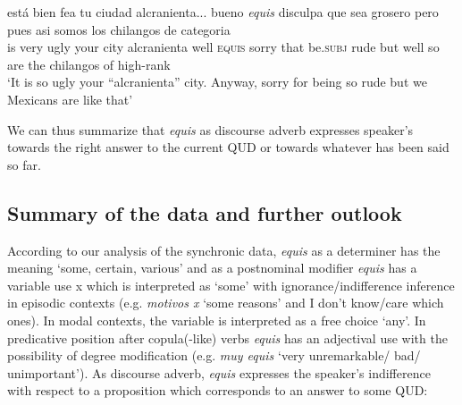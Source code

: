 \documentclass[output=paper
,modfonts
,nonflat]{langsci/langscibook}
\begin{document}
\ea
\gll está bien fea tu ciudad alcranienta... bueno \textit{equis} disculpa que sea grosero pero pues asi somos los chilangos de categoria\\
is very ugly your city alcranienta well \textsc{equis} sorry that be.\textsc{subj} rude but well so are the chilangos of high-rank\\
\glt ‘It is so ugly your “alcranienta” city. Anyway, sorry for being so rude but we Mexicans are like that’
\z

We can thus summarize that \textit{equis} as discourse adverb expresses speaker’s towards the right answer to the current QUD or towards whatever has been said so far.

\subsection{Summary of the data and further outlook}\label{sec:kellert:2.5}
According to our analysis of the synchronic data, \textit{equis} as a determiner has the meaning ‘some, certain, various’ and as a postnominal modifier \textit{equis} has a variable use x which is interpreted as ‘some’ with ignorance/indifference inference in episodic contexts (e.g. \textit{motivos x} ‘some reasons’ and I don’t know/care which ones). In modal contexts, the variable is interpreted as a free choice ‘any’. In predicative position after copula(-like) verbs \textit{equis} has an adjectival use with the possibility of degree modification (e.g. \textit{muy equis} ‘very unremarkable/ bad/ unimportant’). As discourse adverb, \textit{equis} expresses the speaker’s indifference with respect to a proposition which corresponds to an answer to some QUD:
\end{document}
